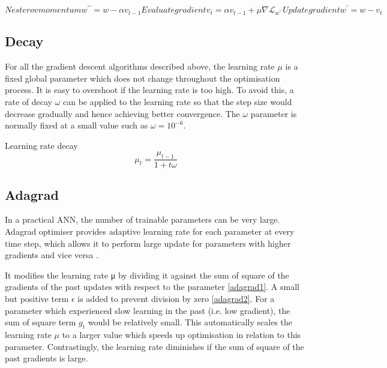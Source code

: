 \documentclass[11pt]{article} %
\theoremstyle{plain}
\theoremstyle{definition}
\begin{document}
\begin{appendices}
	\begin{subequations} 
		
		Nesterov momentum
		\begin{equation}
		\label{nesterov1}
		w^{\prime\prime}=w-\alpha v_{t-1}
		\end{equation}
		
		
		Evaluate gradient
		\begin{equation}
		\label{nesterov2}
		v_t=\alpha v_{t-1}+\mu \nabla \mathcal{L}_{w^{\prime\prime}}
		\end{equation}
		
		Update gradient
		\begin{equation}
		\label{nesterov3}
		w^\prime=w-v_t
		\end{equation}
		
	\end{subequations}
	
	
	
	\subsection{Decay}
	
	For all the gradient descent algorithms described above, the learning rate \(\mu\) is a fixed global parameter which does not change throughout the optimisation process. It is easy to overshoot if the learning rate is too high. To avoid this, a rate of decay \(\omega\) can be applied to the learning rate so that the step size would decrease gradually and hence achieving better convergence. The \(\omega\) parameter is normally fixed at a small value such as \(\omega=10^{-6}\).
	
	Learning rate decay
	\begin{equation}
	\label{decay}
	\mu_t = \frac{\mu_{t-1}}{1+t\omega}
	\end{equation}
	
	
	\subsection{Adagrad}
	
	In a practical ANN, the number of trainable parameters can be very large. Adagrad optimiser provides adaptive learning rate for each parameter at every time step, which allows it to perform large update for parameters with higher gradients and vice versa \cite{duchi2011}.
	
	It modifies the learning rate μ by dividing it against the sum of square of the gradients of the past updates with respect to the parameter \eqref{adagrad1}. A small but positive term \(\epsilon\) is added to prevent division by zero \eqref{adagrad2}. For a parameter which experienced slow learning in the past (i.e. low gradient), the sum of square term \(g_t\) would be relatively small. This automatically scales the learning rate \(\mu\) to a larger value which speeds up optimisation in relation to this parameter. Contrastingly, the learning rate diminishes if the sum of square of the past gradients is large. 
	

\end{appendices}
\end{document}
